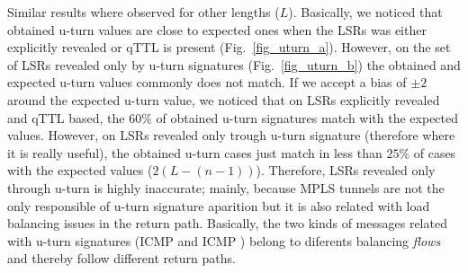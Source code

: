 Similar results where observed for other lengths ($L$). Basically, we noticed
that  obtained u-turn values are close to expected ones when
the LSRs was either explicitly revealed or qTTL is present
(Fig.~\ref{fig_uturn_a}). However, on the set of LSRs revealed only by u-turn
signatures (Fig.~\ref{fig_uturn_b}) the obtained and expected u-turn values  
commonly does not match. If we accept a bias of $ \pm 2$ around the expected
u-turn value, we noticed that on LSRs explicitly revealed and qTTL based, 
the $60\%$ of obtained u-turn signatures match with the
expected values. However, on LSRs revealed only trough
u-turn signature (therefore where it is really useful), the obtained u-turn
cases just match in less than $25\%$ of cases with the expected values ($2(L-(n-1))$).
Therefore, LSRs revealed only through u-turn is highly inaccurate; mainly,
because MPLS tunnels are not the only responsible of u-turn signature aparition but
it is also related with load balancing issues in the return path. Basically, 
the two kinds of messages related with u-turn signatures (ICMP \echoreply  and ICMP
\ttlexceeded) belong to diferents balancing \textit{flows} and thereby follow different return paths. 


